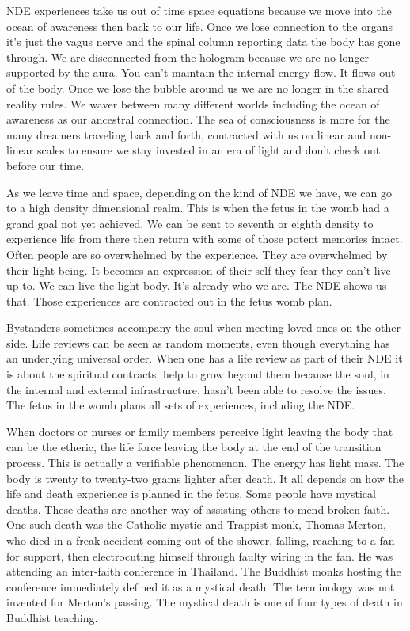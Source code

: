 \documentclass[letterpaper,9pt,twoside,titlepage,onecolumn,openany]{book}
\begin{document}
NDE experiences take us out of time space equations because we move into
the ocean of awareness then back to our life. Once we lose connection to
the organs it's just the vagus nerve and the spinal column reporting
data the body has gone through. We are disconnected from the hologram
because we are no longer supported by the aura. You can't maintain the
internal energy flow. It flows out of the body. Once we lose the bubble
around us we are no longer in the shared reality rules. We waver between
many different worlds including the ocean of awareness as our ancestral
connection. The sea of consciousness is more for the many dreamers
traveling back and forth, contracted with us on linear and non-linear
scales to ensure we stay invested in an era of light and don't check out
before our time.

As we leave time and space, depending on the kind of NDE we have, we can
go to a high density dimensional realm. This is when the fetus in the
womb had a grand goal not yet achieved. We can be sent to seventh or
eighth density to experience life from there then return with some of
those potent memories intact. Often people are so overwhelmed by the
experience. They are overwhelmed by their light being. It becomes an
expression of their self they fear they can't live up to. We can live
the light body. It's already who we are. The NDE shows us that. Those
experiences are contracted out in the fetus womb plan.

Bystanders sometimes accompany the soul when meeting loved ones on the
other side. Life reviews can be seen as random moments, even though
everything has an underlying universal order. When one has a life review
as part of their NDE it is about the spiritual contracts, help to grow
beyond them because the soul, in the internal and external
infrastructure, hasn't been able to resolve the issues. The fetus in the
womb plans all sets of experiences, including the NDE.

When doctors or nurses or family members perceive light leaving the body
that can be the etheric, the life force leaving the body at the end of
the transition process. This is actually a verifiable phenomenon. The
energy has light mass. The body is twenty to twenty-two grams lighter
after death. It all depends on how the life and death experience is
planned in the fetus. Some people have mystical deaths. These deaths are
another way of assisting others to mend broken faith. One such death was
the Catholic mystic and Trappist monk, Thomas Merton, who died in a
freak accident coming out of the shower, falling, reaching to a fan for
support, then electrocuting himself through faulty wiring in the fan. He
was attending an inter-faith conference in Thailand. The Buddhist monks
hosting the conference immediately defined it as a mystical death. The
terminology was not invented for Merton's passing. The mystical death is
one of four types of death in Buddhist teaching.
\end{document}
